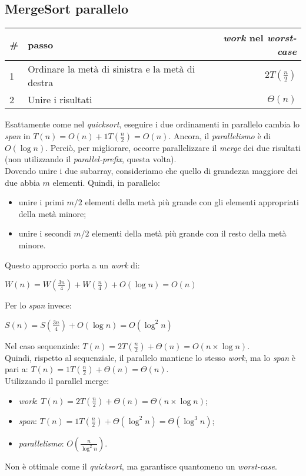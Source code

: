\subsection{MergeSort parallelo}
\begin{center}
	\begin{tabular}{| l | l | r |}
		\hline
		\textbf{\#} & \textbf{passo} & \textbf{\textit{work} nel \textit{worst-case}} \\ \hline
		1 & Ordinare la metà di sinistra e la metà di destra & $2T(\frac{n}{2})$ \\
		2 & Unire i risultati & $\Theta(n)$ \\
		\hline
	\end{tabular}
\end{center}
Esattamente come nel \textit{quicksort}, eseguire i due ordinamenti in parallelo cambia lo \textit{span} in $T(n) = O(n) + 1T(\frac{n}{2}) = O(n)$. Ancora, il \textit{parallelismo} è di $O(\log{n})$. Perciò, per migliorare, occorre parallelizzare il \textit{merge} dei due risultati (non utilizzando il \textit{parallel-prefix}, questa volta). \\
Dovendo unire i due subarray, consideriamo che quello di grandezza maggiore dei due abbia $m$ elementi. Quindi, in parallelo:
\begin{itemize}
	\item unire i primi $m/2$ elementi della metà più grande con gli elementi appropriati della metà minore;
	\item unire i secondi $m/2$ elementi della metà più grande con il resto della metà minore.
\end{itemize}

\newpage

Questo approccio porta a un \textit{work} di:
\begin{center}
	$W(n) = W(\frac{3n}{4}) + W(\frac{n}{4}) + O(\log{n}) = O(n)$
\end{center}
Per lo \textit{span} invece:
\begin{center}
	$S(n) = S(\frac{3n}{4}) + O(\log{n}) = O(\log^{2}n)$
\end{center}
Nel caso sequenziale: $T(n) = 2T(\frac{n}{2}) + \Theta(n) = O(n\times \log{n})$. \\
Quindi, rispetto al sequenziale, il parallelo mantiene lo stesso \textit{work}, ma lo \textit{span} è pari a: $T(n) = 1T(\frac{n}{2}) + \Theta(n) = \Theta(n)$. \\
Utilizzando il parallel merge:
\begin{itemize}
	\item \textit{work}: $T(n) = 2T(\frac{n}{2}) + \Theta(n) = \Theta(n\times \log{n})$;
	\item \textit{span}: $T(n) = 1T(\frac{n}{2}) + \Theta(\log^{2}{n}) = \Theta(\log^{3}{n})$;
	\item \textit{parallelismo}: $O(\frac{n}{\log^{2}{n}})$.
\end{itemize}
Non è ottimale come il \textit{quicksort}, ma garantisce quantomeno un \textit{worst-case}.